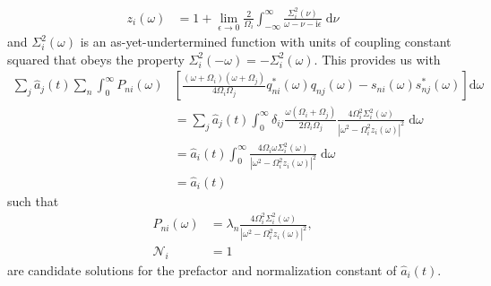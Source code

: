 \begin{equation}
\begin{split}
z_i(\omega) &= 1 + \lim_{\epsilon\to0}\frac{2}{\Omega_i}\int_{-\infty}^{\infty}\frac{\Sigma_i^2(\nu)}{\omega - \nu - \mathrm{i}\epsilon}\;\mathrm{d}\nu
\end{split}
\end{equation}
and $\Sigma_i^2(\omega)$ is an as-yet-undertermined function with units of coupling constant squared that obeys the property $\Sigma_i^2(-\omega) = -\Sigma_i^2(\omega)$. This provides us with
\begin{equation}
\begin{split}
\sum_j\hat{a}_j(t)\sum_n\int_0^\infty P_{ni}(\omega)&\left[\frac{(\omega + \Omega_i)(\omega + \Omega_j)}{4\Omega_i\Omega_j}q_{ni}^*(\omega)q_{nj}(\omega) - s_{ni}(\omega)s_{nj}^*(\omega)\right]\mathrm{d}\omega\\
&= \sum_j\hat{a}_j(t)\int_0^\infty\delta_{ij}\frac{\omega(\Omega_i + \Omega_j)}{2\Omega_i\Omega_j}\frac{4\Omega_i^2\Sigma_i^2(\omega)}{|\omega^2 - \Omega_i^2z_i(\omega)|^2}\;\mathrm{d}\omega\\
&= \hat{a}_i(t)\int_0^\infty\frac{4\Omega_i\omega\Sigma_i^2(\omega)}{|\omega^2 - \Omega_i^2z_i(\omega)|^2}\;\mathrm{d}\omega\\
&= \hat{a}_i(t)
\end{split}
\end{equation}
such that
\begin{equation}
\begin{split}
P_{ni}(\omega) &= \lambda_n\frac{4\Omega_i^2\Sigma_i^2(\omega)}{|\omega^2 - \Omega_i^2z_i(\omega)|^2},\\
\mathcal{N}_i &= 1
\end{split}
\end{equation}
are candidate solutions for the prefactor and normalization constant of $\hat{a}_i(t)$.

